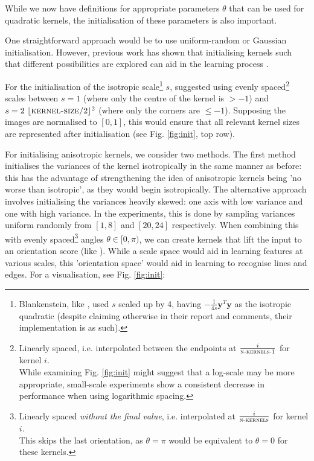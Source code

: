 \documentclass[a4paper, 12pt]{report}
\begin{document}
While we now have definitions for appropriate parameters $\theta$ that can be used for quadratic kernels, the initialisation of these parameters is also important.

One straightforward approach would be to use uniform-random or Gaussian initialisation. However, previous work  has shown that initialising kernels such that different possibilities are explored can aid in the learning process \cite{thierrybsc}.

For the initialisation of the isotropic scale\footnote{Blankenstein, like \cite{groenendijk2022morphpool}, used $s$ scaled up by 4, having $-\frac{1}{4s}\mathbf{y}^T\mathbf{y}$ as the isotropic quadratic (despite claiming otherwise in their report and comments, their implementation is as such). } $s$, \cite{thierrybsc} suggested using evenly spaced\footnote{Linearly spaced, i.e. interpolated between the endpoints at $\frac{i}{\textsc{n-kernels-1}}$ for kernel $i$.\\While examining Fig. \ref{fig:init} might suggest that a log-scale may be more appropriate, small-scale experiments show a consistent decrease in performance when using logarithmic spacing.  } scales between $s=1$ (where only the centre of the kernel is $>-1$) and $s=2~\lfloor\textsc{kernel-size}/2\rfloor^2$ (where only the corners are $\leq-1$). Supposing the images are normalised to $[0, 1]$, this would ensure that all relevant kernel sizes are represented after initialisation (see Fig. \ref{fig:init}, top row).

For initialising anisotropic kernels, we consider two methods. The first method initialises the variances of the kernel isotropically in the same manner as before: this has the advantage of strengthening the idea of anisotropic kernels being 'no worse than isotropic', as they would begin isotropically. The alternative approach involves initialising the variances heavily skewed: one axis with low variance and one with high variance. In the experiments, this is done by sampling variances uniform randomly from $[1, 8]$ and $[20, 24]$ respectively. When combining this with evenly spaced\footnote{Linearly spaced \textit{without the final value}, i.e. interpolated at $\frac{i}{\textsc{n-kernels}}$ for kernel $i$.
\\
This skips the last orientation, as $\theta=\pi$ would be equivalent to $\theta=0$ for these kernels. \vspace{-0.25cm}
} angles $\theta\in[0, \pi)$, we can create kernels that lift the input to an orientation score (like \cite{smetspde}). While a scale space would aid in learning features at various scales, this 'orientation space' would aid in learning to recognise lines and edges. For a visualisation, see Fig. \ref{fig:init}:
\end{document}
